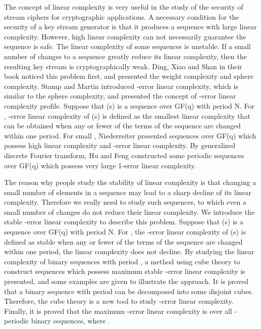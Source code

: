 \documentclass[10pt,conference,twocolumn]{IEEEtran}
\begin{document}
The concept of linear complexity is very useful in the study of the
security of stream ciphers for cryptographic applications. A
necessary condition for the security of a key stream generator is
that it produces a sequence with large linear complexity. However,
high linear complexity can not necessarily guarantee the sequence is
safe. The linear complexity of some sequences is unstable. If a
small number of changes to a sequence greatly reduce its linear
complexity, then the resulting key stream is cryptographically weak.
Ding, Xiao and Shan in their book \cite{Ding} noticed this problem
first, and presented the weight complexity and sphere complexity.
Stamp and Martin \cite{Stamp} introduced -error linear
complexity, which is similar to the sphere complexity, and presented
the concept of -error linear complexity profile. Suppose that (s)
is a sequence over GF(q) with period N. For ,
-error linear complexity of (s) is defined as the smallest linear
complexity that can be obtained when any  or fewer of the terms
of the sequence are changed within one period. For small ,
Niederreiter \cite{Niederreiter} presented sequences over GF(q)
which possess high linear complexity and -error linear
complexity. By generalized discrete Fourier transform, Hu and Feng
\cite{Hu} constructed some periodic sequences over GF(q) which
possess very large 1-error linear complexity.

The reason why people study the stability of linear complexity is
that changing a small number of elements in a sequence may lead to a
sharp decline of its linear complexity. Therefore we really need to
study such sequences, to which even a small number of changes do not
reduce their linear complexity. We introduce the stable -error
linear complexity to describe this problem. Suppose that (s) is a
sequence over GF(q) with period N. For , the
-error linear complexity of (s) is defined as stable when any 
or fewer of the terms of the sequence are changed within one period,
the linear complexity does not decline. By studying the linear
complexity of binary sequences with period , a method using
cube theory to construct sequences which possess maximum stable
-error linear complexity is presented, and some examples are
given to illustrate the approach.  It is  proved that a binary
sequence with period  can be decomposed into some disjoint
cubes. Therefore, the cube theory is a new tool to study -error
linear complexity. Finally, it is proved that the maximum  -error
linear complexity is  over all -periodic binary
sequences, where .
\end{document}

